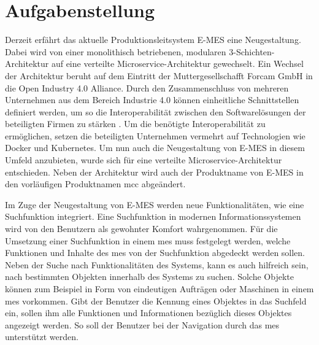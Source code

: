 \section{Aufgabenstellung\label{sec1.2:Unterpunkt-2}}

Derzeit erfährt das aktuelle Produktionsleitsystem E-MES eine Neugestaltung. Dabei wird von einer monolithisch betriebenen, modularen 3-Schichten-Architektur auf eine verteilte Microservice-Architektur gewechselt. Ein Wechsel der Architektur beruht auf dem Eintritt der Muttergesellschafft Forcam GmbH in die \glqq Open Industry 4.0 Alliance\grqq{}. Durch den Zusammenschluss von mehreren Unternehmen aus dem Bereich \glqq Industrie 4.0\grqq{} können einheitliche Schnittstellen definiert werden, um so die Interoperabilität zwischen den Softwarelösungen der beteiligten Firmen zu stärken \cite{OpenIndustry4.0Alliance.2021}. Um die benötigte Interoperabilität zu ermöglichen, setzen die beteiligten Unternehmen vermehrt auf Technologien wie Docker und Kubernetes. Um nun auch die Neugestaltung von E-MES in diesem Umfeld anzubieten, wurde sich für eine verteilte Microservice-Architektur entschieden. Neben der Architektur wird auch der Produktname von \glqq E-MES\grqq{} in den vorläufigen Produktnamen \glqq \gls{mcc}\grqq{} abgeändert.


Im Zuge der Neugestaltung von E-MES werden neue Funktionalitäten, wie eine Suchfunktion integriert. Eine Suchfunktion in modernen Informationssystemen wird von den Benutzern als gewohnter Komfort wahrgenommen. Für die Umsetzung einer Suchfunktion in einem \gls{mes} muss festgelegt werden, welche Funktionen und Inhalte des \gls{mes} von der Suchfunktion abgedeckt werden sollen. Neben der Suche nach Funktionalitäten des Systems, kann es auch hilfreich sein, nach bestimmten \glqq Objekten\grqq{} innerhalb des Systems zu suchen. Solche Objekte können zum Beispiel in Form von eindeutigen Aufträgen oder Maschinen in einem \gls{mes} vorkommen. Gibt der Benutzer die Kennung eines Objektes in das Suchfeld ein, sollen ihm alle Funktionen und Informationen bezüglich dieses Objektes angezeigt werden. So soll der Benutzer bei der Navigation durch das \gls{mes} unterstützt werden.

